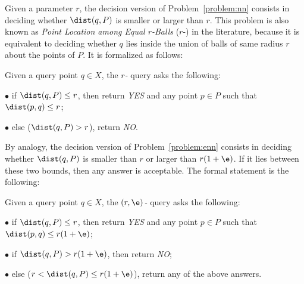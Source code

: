 Given a parameter $r$, the decision version of
Problem~\ref{problem:nn} consists in deciding whether $\dist(q,P)$ is
smaller or larger than $r$. This problem is also known as {\em Point
  Location among Equal $r$-Balls} ($r$-\pleb) in the literature, because
it is equivalent to deciding whether $q$ lies inside the union of
balls of same radius $r$ about the points of $P$. It is
formalized as follows:
\begin{problem}[$r$-\pleb] \label{problem:pleb}
  Given a query point $q\in X$, the {\em $r$-\pleb} query asks
  the following:
  \begin{slist}
  \item[$\bullet$] if $\dist(q,P)\leq r$, then return {\em
    YES} and any point $p\in P$ such that $\dist(p,q)\leq r$;
  \item[$\bullet$] else {\rm ($\dist(q,P)> r$)}, return {\em NO}.
  \end{slist}
\end{problem}
By analogy, the decision version of Problem~\ref{problem:enn} consists
in deciding whether $\dist(q,P)$ is smaller than $r$ or larger than
$r(1+\e)$. If it lies between these two bounds, then any answer is
acceptable.  The formal statement is the following:
\begin{problem}[$(r,\e)$-\pleb] \label{problem:epleb}
  Given a query point $q\in X$, the
  {\em $(r,\e)$-\pleb}  query asks the following:
  \begin{slist}
  \item[$\bullet$] if $\dist(q,P)\leq r$, then return {\em
    YES} and any point $p\in P$ such that $\dist(p,q)\leq r(1+\e)$;
  \item[$\bullet$] if $\dist(q,P)> r(1+\e)$, then return {\em NO};
  \item[$\bullet$] else {\rm ($r < \dist(q, P)\leq r(1+\e)$)},
    return any of the above answers.
  \end{slist}
\end{problem}


